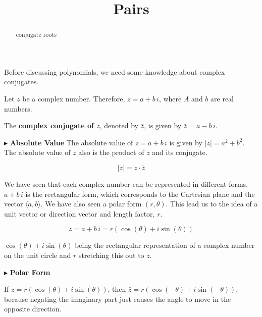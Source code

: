 \documentclass{ximera}
\title{Pairs}
\begin{document}
\begin{abstract}
conjugate roots
\end{abstract}
\maketitle







Before discussing polynomials, we need some knowledge about complex conjugates.




\begin{definition}

Let $z$ be a complex number.  Therefore, $z = a + b \, i$, where $A$ and $b$ are real numbers.



The \textbf{complex conjugate of $z$}, denoted by $\bar{z}$, is given by $\bar{z} = a - b \, i$.



\end{definition}






$\blacktriangleright$ \textbf{Absolute Value}
The absolute value of $z = a + b \, i$ is given by $|z| = a^2 + b^2$. The absolute value of $z$ also is the product of $z$ and its conjugate.

\[   |z| = z \cdot \bar{z}    \]





We have seen that each complex number can be represented in different forms.  $a + b \, i$ is the rectangular form, which corresponds to the Cartesian plane and the vector $\langle a, b\rangle$.  We have also seen a polar form $(r, \theta)$.  This lead us to the idea of a unit vector or direction vector and length factor, $r$.

\[ z = a + b \, i = r (\cos(\theta) + i \sin(\theta))  \]


$\cos(\theta) + i \sin(\theta)$ being the rectangular representation of a complex number on the unit circle and $r$ stretching this out to $z$.






$\blacktriangleright$ \textbf{Polar Form}

If $z = r (\cos(\theta) + i \sin(\theta))$, then $\bar{z} = r (\cos(-\theta) + i \sin(-\theta))$, because negating the imaginary part just causes the angle to move in the opposite direction.
\end{document}
